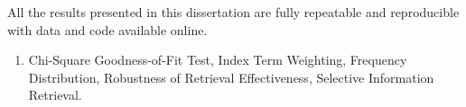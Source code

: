 \begin{spacing}{1.2}
All the results presented in this dissertation are fully repeatable and reproducible with data and code available online.\\

\setlength\leftmargini{2.5cm}
\begin{enumerate}[label=\noindent{\textbf{Keywords:}}]
  \item Chi-Square Goodness-of-Fit Test, Index Term Weighting, Frequency Distribution, Robustness of Retrieval Effectiveness, Selective Information Retrieval.
\end{enumerate}

\end{spacing}
